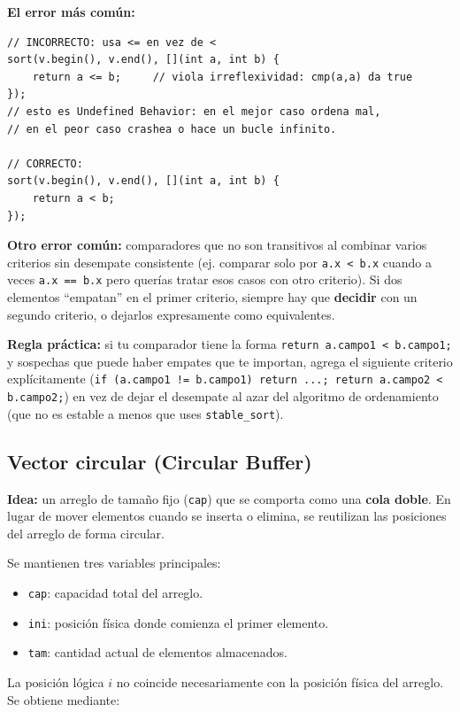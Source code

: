 \documentclass[10pt,a4paper,twocolumn]{article}
\begin{document}
\textbf{El error más común:}

\begin{lstlisting}[style=cpp]
// INCORRECTO: usa <= en vez de <
sort(v.begin(), v.end(), [](int a, int b) {
    return a <= b;     // viola irreflexividad: cmp(a,a) da true
});
// esto es Undefined Behavior: en el mejor caso ordena mal,
// en el peor caso crashea o hace un bucle infinito.

// CORRECTO:
sort(v.begin(), v.end(), [](int a, int b) {
    return a < b;
});
\end{lstlisting}

\textbf{Otro error común:} comparadores que no son transitivos al
combinar varios criterios sin desempate consistente (ej. comparar
solo por \texttt{a.x < b.x} cuando a veces \texttt{a.x == b.x} pero
querías tratar esos casos con otro criterio). Si dos elementos
``empatan'' en el primer criterio, siempre hay que \textbf{decidir}
con un segundo criterio, o dejarlos expresamente como equivalentes.

\textbf{Regla práctica:} si tu comparador tiene la forma
\texttt{return a.campo1 < b.campo1;} y sospechas que puede haber
empates que te importan, agrega el siguiente criterio explícitamente
(\texttt{if (a.campo1 != b.campo1) return ...; return
a.campo2 < b.campo2;}) en vez de dejar el desempate al azar del
algoritmo de ordenamiento (que no es estable a menos que uses
\texttt{stable\_sort}).


\subsection{Vector circular (Circular Buffer)}

\textbf{Idea:} un arreglo de tamaño fijo (\texttt{cap}) que se comporta
como una \textbf{cola doble}. En lugar de mover elementos cuando se
inserta o elimina, se reutilizan las posiciones del arreglo de forma
circular.

Se mantienen tres variables principales:

\begin{itemize}
    \item \texttt{cap}: capacidad total del arreglo.
    \item \texttt{ini}: posición física donde comienza el primer elemento.
    \item \texttt{tam}: cantidad actual de elementos almacenados.
\end{itemize}

La posición lógica $i$ no coincide necesariamente con la posición física
del arreglo. Se obtiene mediante:
\end{document}
